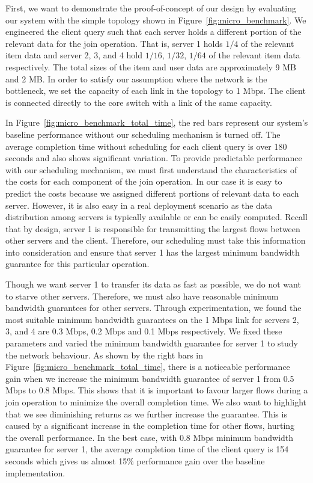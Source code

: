 \documentclass{sig-alternate-2013}
\begin{document}
First, we want to demonstrate the proof-of-concept of our design by evaluating our system with the simple topology shown in Figure~\ref{fig:micro_benchmark}.
We engineered the client query such that each server holds a different portion of the relevant data for the join operation.
That is, server 1 holds $1/4$ of the relevant item data and server 2, 3, and 4 hold $1/16$, $1/32$, $1/64$ of the relevant item data respectively.
The total sizes of the item and user data are approximately 9 MB and 2 MB\@.
In order to satisfy our assumption where the network is the bottleneck, we set the capacity of each link in the topology to 1 Mbps.
The client is connected directly to the core switch with a link of the same capacity.

In Figure~\ref{fig:micro_benchmark_total_time}, the red bars represent our system's baseline performance without our scheduling mechanism is turned off.
The average completion time without scheduling for each client query is over 180 seconds and also shows significant variation.
To provide predictable performance with our scheduling mechanism, we must first understand the characteristics of the costs for each component of the join operation.
In our case it is easy to predict the costs because we assigned different portions of relevant data to each server.
However, it is also easy in a real deployment scenario as the data distribution among servers is typically available or can be easily computed.
Recall that by design, server 1 is responsible for transmitting the largest flows between other servers and the client.
Therefore, our scheduling must take this information into consideration and ensure that server 1 has the largest minimum bandwidth guarantee for this particular operation.

Though we want server 1 to transfer its data as fast as possible, we do not want to starve other servers.
Therefore, we must also have reasonable minimum bandwidth guarantees for other servers.
Through experimentation, we found the most suitable minimum bandwidth guarantees on the 1 Mbps link for servers 2, 3, and 4 are 0.3 Mbps, 0.2 Mbps and 0.1 Mbps respectively.
We fixed these parameters and varied the minimum bandwidth guarantee for server 1 to study the network behaviour.
As shown by the right bars in Figure~\ref{fig:micro_benchmark_total_time}, there is a noticeable performance gain when we increase the minimum bandwidth guarantee of server 1 from 0.5 Mbps to 0.8 Mbps.
This shows that it is important to favour larger flows during a join operation to minimize the overall completion time.
We also want to highlight that we see diminishing returns as we further increase the guarantee.
This is caused by a significant increase in the completion time for other flows, hurting the overall performance.
In the best case, with 0.8 Mbps minimum bandwidth guarantee for server 1, the average completion time of the client query is 154 seconds which gives us almost 15\% performance gain over the baseline implementation.
\end{document}
